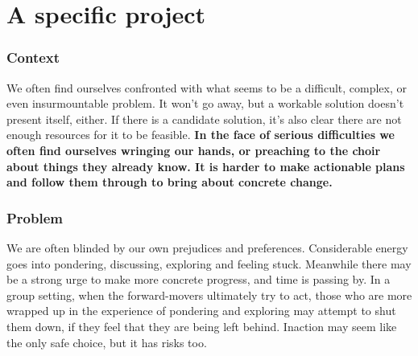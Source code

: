 \section{A specific project}\label{sec:A specific project}
\subsubsection*{Context}
We often find ourselves confronted with what seems to be a difficult, complex, or even insurmountable problem.  It won't go away, but a workable solution doesn't present itself, either.  If there is a candidate solution, it's also clear there are not enough resources for it to be feasible.
\textbf{In the face of serious difficulties we often find ourselves wringing our hands, or preaching to the choir about things they already know.  It is harder to make actionable plans and follow them through to bring about concrete change.}

\subsubsection*{Problem}
We are often blinded by our own prejudices and preferences.  Considerable energy goes into pondering, discussing, exploring and feeling stuck.  Meanwhile there may be a strong urge to make more concrete progress, and time is passing by.  In a group setting, when the forward-movers ultimately try to act, those who are more wrapped up in the experience of pondering and exploring may attempt to shut them down, if they feel that they are being left behind.  Inaction may seem like the only safe choice, but it has risks too.

